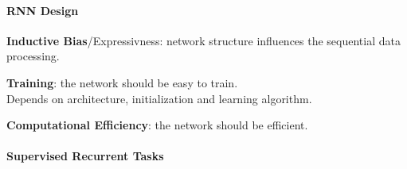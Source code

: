 \documentclass[10pt]{report}
\begin{document}
\paragraph{RNN Design}\begin{list}{}{}
	\item \textbf{Inductive Bias}/Expressivness: network structure influences the sequential data processing.
	\item \textbf{Training}: the network should be easy to train.\\
	Depends on architecture, initialization and learning algorithm.
	\item \textbf{Computational Efficiency}: the network should be efficient.
\end{list}
\paragraph{Supervised Recurrent Tasks}
\end{document}
